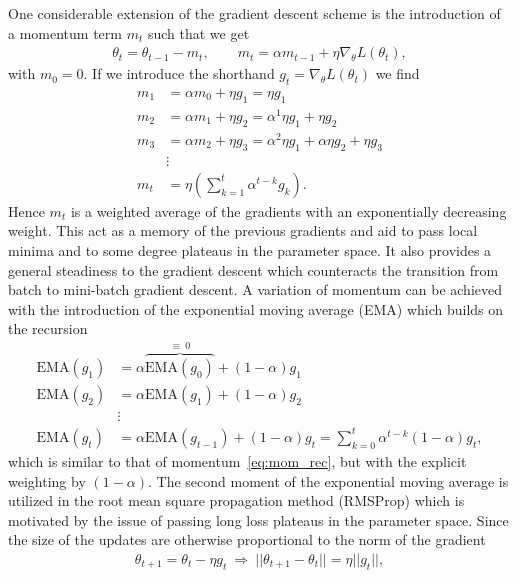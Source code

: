One considerable extension of the gradient descent scheme is the introduction of a momentum term $m_t$ such that we get
\begin{align}
  \theta_t = \theta_{t-1} - m_t, \qquad m_t = \alpha m_{t-1} + \eta \nabla_\theta L(\theta_t),
  \label{eq:mom}
\end{align}
with $m_0 = 0$. If we introduce the shorthand $g_t = \nabla_\theta L(\theta_t)$ we find
\begin{align}
  m_1 &= \alpha m_0 + \eta g_1 = \eta g_1 \nonumber \\
  m_2 &= \alpha m_1 + \eta g_2 = \alpha^1 \eta g_1 + \eta g_2 \nonumber \\
  m_3 &= \alpha m_2 + \eta g_3 = \alpha^2 \eta g_1 + \alpha\eta g_2 + \eta g_3 \nonumber \\
  &\vdots \nonumber \\
  m_t &= \eta \left(\sum_{k=1}^{t} \alpha^{t-k}g_k\right).
  \label{eq:mom_rec}
\end{align}
Hence $m_t$ is a weighted average of the gradients with an exponentially decreasing weight. This act as a memory of the previous gradients and aid to pass local minima and to some degree plateaus in the parameter space. It also provides a general steadiness to the gradient descent which counteracts the transition from batch to mini-batch gradient descent. A variation of momentum can be achieved with the introduction of the exponential moving average (EMA) which builds on the recursion
\begin{align*}
    \text{EMA}(g_1) &= \alpha \overbrace{\text{EMA}(g_0)}^{\equiv \ 0} + (1-\alpha)g_1 \\
    \text{EMA}(g_2) &= \alpha \text{EMA}(g_1) + (1-\alpha)g_2 \\
    &\vdots \\
    \text{EMA}(g_t) &= \alpha \text{EMA}(g_{t-1}) + (1-\alpha)g_t  = \sum_{k=0}^t \alpha^{t-k}(1-\alpha)g_t,
\end{align*}
which is similar to that of momentum~\cref{eq:mom_rec}, but with the explicit weighting by $(1-\alpha)$. The second moment of the exponential moving average is utilized in the root mean square propagation method (\acrshort{RMSProp}) which is motivated by the issue of passing long loss plateaus in the parameter space. Since the size of the updates are otherwise proportional to the norm of the gradient
\begin{align*}
  \theta_{t+1} = \theta_t - \eta g_t \ \Longrightarrow \ ||\theta_{t+1}-\theta_{t}|| = \eta ||g_t||,
\end{align*}
